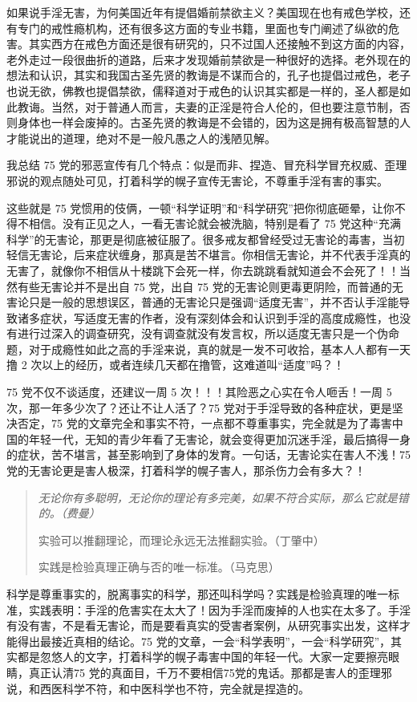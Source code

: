 如果说手淫无害，为何美国近年有提倡婚前禁欲主义？美国现在也有戒色学校，还有专门的戒性瘾机构，还有很多这方面的专业书籍，里面也专门阐述了纵欲的危害。其实西方在戒色方面还是很有研究的，只不过国人还接触不到这方面的内容，老外走过一段很曲折的道路，后来才发现婚前禁欲是一种很好的选择。老外现在的想法和认识，其实和我国古圣先贤的教诲是不谋而合的，孔子也提倡过戒色，老子也说无欲，佛教也提倡禁欲，儒释道对于戒色的认识其实都是一样的，圣人都是如此教诲。当然，对于普通人而言，夫妻的正淫是符合人伦的，但也要注意节制，否则身体也一样会废掉的。古圣先贤的教诲是不会错的，因为这是拥有极高智慧的人才能说出的道理，绝对不是一般凡愚之人的浅陋见解。

我总结 75 党的邪恶宣传有几个特点：似是而非、捏造、冒充科学冒充权威、歪理邪说的观点随处可见，打着科学的幌子宣传无害论，不尊重手淫有害的事实。

这些就是 75 党惯用的伎俩，一顿“科学证明”和“科学研究”把你彻底砸晕，让你不得不相信。没有正见之人，一看无害论就会被洗脑，特别是看了 75 党这种“充满科学”的无害论，那更是彻底被征服了。很多戒友都曾经受过无害论的毒害，当初轻信无害论，后来症状缠身，那真是苦不堪言。你相信无害论，并不代表手淫真的无害了，就像你不相信从十楼跳下会死一样，你去跳跳看就知道会不会死了！！当然有些无害论并不是出自 75 党，出自 75 党的无害论则更毒更阴险，而普通的无害论只是一般的思想误区，普通的无害论只是强调“适度无害”，并不否认手淫能导致诸多症状，写适度无害的作者，没有深刻体会和认识到手淫的高度成瘾性，也没有进行过深入的调查研究，没有调查就没有发言权，所以适度无害只是一个伪命题，对于成瘾性如此之高的手淫来说，真的就是一发不可收拾，基本人人都有一天撸 2 次以上的经历，或者连续几天都在撸管，这难道叫“适度”吗？！

75 党不仅不谈适度，还建议一周 5 次！！！其险恶之心实在令人咂舌！一周 5 次，那一年多少次了？还让不让人活了？75 党对于手淫导致的各种症状，更是坚决否定，75 党的文章完全和事实不符，一点都不尊重事实，完全就是为了毒害中国的年轻一代，无知的青少年看了无害论，就会变得更加沉迷手淫，最后搞得一身的症状，苦不堪言，甚至影响到了身体的发育。一句话，无害论实在害人不浅！75 党的无害论更是害人极深，打着科学的幌子害人，那杀伤力会有多大？！

\begin{quote}\it
    无论你有多聪明，无论你的理论有多完美，如果不符合实际，那么它就是错的。\hfill （费曼）

    实验可以推翻理论，而理论永远无法推翻实验。\hfill （丁肇中）

    实践是检验真理正确与否的唯一标准。\hfill （马克思）
\end{quote}

科学是尊重事实的，脱离事实的科学，那还叫科学吗？实践是检验真理的唯一标准，实践表明：手淫的危害实在太大了！因为手淫而废掉的人也实在太多了。手淫有没有害，不是看无害论，而是要看真实的受害者案例，从研究事实出发，这样才能得出最接近真相的结论。75 党的文章，一会“科学表明”，一会“科学研究”，其实都是忽悠人的文字，打着科学的幌子毒害中国的年轻一代。大家一定要擦亮眼睛，真正认清75 党的真面目，千万不要相信75党的鬼话。那都是害人的歪理邪说，和西医科学不符，和中医科学也不符，完全就是捏造的。

